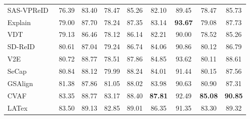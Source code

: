 \documentclass[runningheads]{llncs}
\makeatletter
\let\leaderboards@table\table
\let\leaderboards@endtable\endtable
\renewenvironment{table}[1][]{\leaderboards@table[H]}{\leaderboards@endtable}
\makeatother
\begin{document}
\begin{table}[t]
\begin{tabular}{lcccccccc}
    \Xhline{0.6pt}
    SAS-VPReID~\cite{yang2026sas}      & 76.39                               & 83.40                  & 78.47                   & 85.26                  & 82.10                   & 89.45                  & 78.47                   & 85.73                  \\
    Explain~\cite{nguyen2023aerial}    & 79.00                               & 87.70                  & 78.24                   & 87.35                  & 83.14                   & \textbf{93.67}         & 79.08                   & 87.73                  \\
    VDT~\cite{zhang2024view}           & 79.13                               & 86.46                  & 78.12                   & 86.14                  & 82.21                   & 90.00                  & 78.52                   & 85.26                  \\
    SD-ReID~\cite{wang2026sd}          & 80.61                               & 87.04                  & 79.24                   & 86.74                  & 84.06                   & 90.86                  & 80.12                   & 86.79                  \\
    V2E~\cite{nguyen2024ag}            & 80.72                               & 88.77                  & 78.51                   & 87.86                  & 84.85                   & 93.62                  & 80.11                   & 88.61                  \\
    SeCap~\cite{wang2025secap}         & 80.84                               & 88.12                  & 79.99                   & 88.24                  & 84.01                   & 91.44                  & 80.15                   & 87.56                  \\
    GSAlign~\cite{li2026gsalign}       & 81.38                               & 87.86                  & 81.05                   & 88.02                  & 83.98                   & 90.63                  & 80.90                   & 87.31                  \\
    CVAF~\cite{mao2026cvaf}            & 83.35                               & 88.77                  & 83.17                   & 88.40                  & \textbf{87.81}          & 92.49                  & \textbf{85.08}          & \textbf{90.85}         \\
    LATex~\cite{zhang2025latex}        & 83.50                               & 89.13                  & 82.85                   & 89.01                  & 86.35                   & 91.35                  & 83.30                   & 89.32                  \\

\end{tabular}
\end{table}
\end{document}
